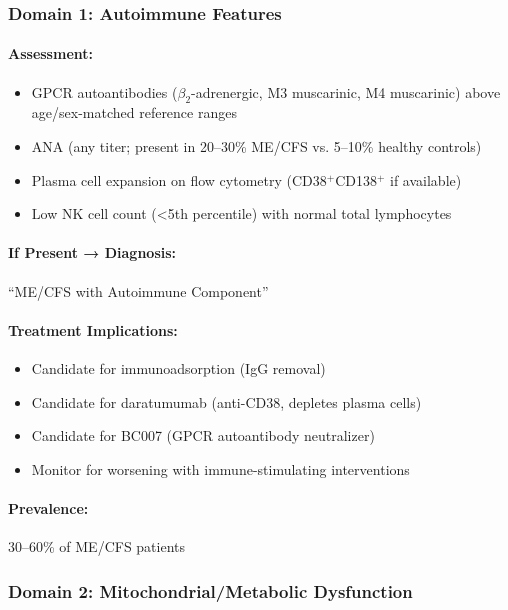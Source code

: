 \subsubsection{Domain 1: Autoimmune Features}

\paragraph{Assessment:}
\begin{itemize}
    \item GPCR autoantibodies ($\beta_2$-adrenergic, M3 muscarinic, M4 muscarinic) above age/sex-matched reference ranges~\cite{Loebel2016,Bynke2020}
    \item ANA (any titer; present in 20--30\% ME/CFS vs. 5--10\% healthy controls)
    \item Plasma cell expansion on flow cytometry (CD38$^+$CD138$^+$ if available)
    \item Low NK cell count (<5th percentile) with normal total lymphocytes
\end{itemize}

\paragraph{If Present → Diagnosis:} ``ME/CFS with Autoimmune Component''

\paragraph{Treatment Implications:}
\begin{itemize}
    \item Candidate for immunoadsorption (IgG removal)~\cite{Stein2024immunoadsorption}
    \item Candidate for daratumumab (anti-CD38, depletes plasma cells)~\cite{Fluge2025daratumumab}
    \item Candidate for BC007 (GPCR autoantibody neutralizer)~\cite{Hohberger2021bc007}
    \item Monitor for worsening with immune-stimulating interventions
\end{itemize}

\paragraph{Prevalence:} 30--60\% of ME/CFS patients

\subsubsection{Domain 2: Mitochondrial/Metabolic Dysfunction}

